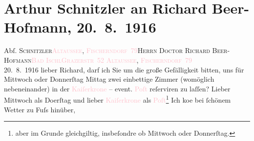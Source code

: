 

               \section[Arthur Schnitzler an Richard Beer-Hofmann, 20. 8. 1916]{ Arthur Schnitzler an Richard Beer-Hofmann, 20. 8. 1916}\nopagebreak{}\rehead{ }\normalsize\beginnumbering{} \toendnotes[C]{\smallbreak\pagebreak[2]} 
\pstart{}{\pb}Abſ. \textsc{Schnitzler}\pend{}\pstart{}\textsc{\textcolor{pink}{Altaussee}{}\ledrightnote{\textcolor{pink}{Altaussee}}, \textcolor{pink}{Fischerndorf 79}{}\ledrightnote{\textcolor{pink}{Fischerndorf}}}\pend{}{\bigskip}\pstart{}\textsc{Herrn Doctor Richard Beer-Hofmann}\pend{}\pstart{}\textcolor{pink}{\textsc{Bad Ischl}}{}\ledrightnote{\textcolor{pink}{Bad Ischl}}\pend{}\pstart{}\textcolor{pink}{\textsc{Grazerstr 52}}{}\ledrightnote{\textcolor{pink}{Grazer Straße}}\pend{}{\bigskip}\pstart
           \raggedleft{}{\pb}\textsc{\textcolor{pink}{Altaussee}{}\ledrightnote{\textcolor{pink}{Altaussee}}, \textcolor{pink}{Fischerndorf 79}{}\ledrightnote{\textcolor{pink}{Fischerndorf}}}{\\}20. 8. 1916\pend
           \pstart
           lieber Richard, darf ich Sie um die große Gefälligkeit bitten, uns
               für Mittwoch oder Donnerſtag{ }Mittag zwei einbettige Zimmer (womöglich nebeneinander) in der \textcolor{pink}{Kaiſerkrone}{}\ledrightnote{\textcolor{pink}{Hotel Kaiserkrone}} – event. \textcolor{pink}{Poſt}{}\ledrightnote{\textcolor{pink}{Hotel Post}} reſerviren zu laſſen? Lieber Mittwoch als Do{\geminationn}erſtag und lieber \textcolor{pink}{Kaiſerkrone}{}\ledrightnote{\textcolor{pink}{Hotel Kaiserkrone}} als \textcolor{pink}{Poſt}{}\ledrightnote{\textcolor{pink}{Hotel Post}}\footnote{\noindent{}aber im Grunde gleichgiltig, insbeſondre ob Mittwoch oder
                        Donnerſtag.} Ich ko{\geminationm}e bei ſchönem Wetter zu Fuſs hinüber,
